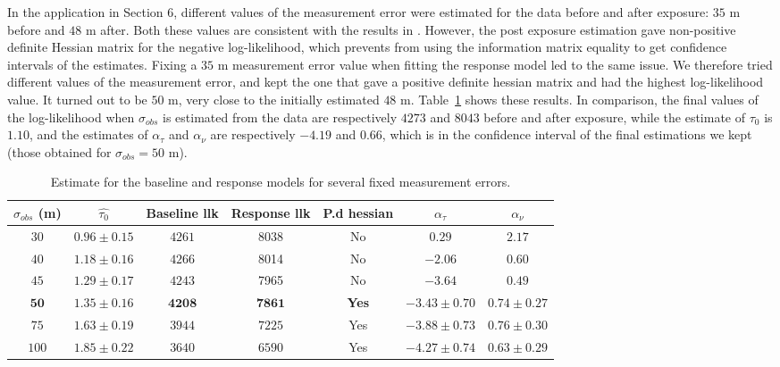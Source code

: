 \documentclass[aoas]{imsart}
\theoremstyle{definition}
\theoremstyle{remark}
\theoremstyle{remark}
\newcommand {\1}{\mathbb{1}}
\begin{document}
In the application in Section 6, different values of the measurement error were estimated for the data before and after exposure: $35$ m before and $48$ m after. Both these values are consistent with the results in \citep{wensveen_path_2015}. However, the post exposure estimation gave non-positive definite Hessian matrix for the negative log-likelihood, which prevents from using the information matrix equality to get confidence intervals of the estimates. Fixing a $35$ m measurement error value when fitting the response model led to the same issue. We therefore tried different values of the measurement error, and kept the one that gave a positive definite hessian matrix and had the highest log-likelihood value. It turned out to be $50$ m, very close to the initially estimated $48$ m. Table~\ref{tab: estimates for fixed measurement errors} shows these results. In comparison, the final values of the log-likelihood when $\sigma_{obs}$ is estimated from the data are respectively $4273$ and $8043$ before and after exposure, while the estimate of $\tau_0$ is $1.10$, and the estimates of $\alpha_\tau$ and $\alpha_\nu$ are respectively $-4.19$ and $0.66$, which is in the confidence interval of the final estimations we kept (those obtained for $\sigma_{obs}=50$ m).
\begin{table}[ht!]
	\centering
	\begin{tabular}{|c|c|c|c|c|c|c|}
		\hline
		$\sigma_{obs}$ (m) & $\hat{\tau_0}$ & Baseline llk & Response llk & P.d hessian & $\alpha_{\tau}$ & $\alpha_\nu$ \\
		\hline
		$30$  & $0.96 \pm 0.15$ & $4261$  & 8038 & No & $0.29$ & $2.17$ \\
		\hline
		$40$  & $1.18 \pm 0.16$   & $4266$ & 8014  & No  & $-2.06$ & $0.60$\\
		\hline
		$45$  & $1.29 \pm 0.17$   & $4243$ & 7965  & No & $-3.64$ & $0.49$\\
		\hline
		$\mathbf{50}$  & $\mathbf{1.35 \pm 0.16}$ & $\mathbf{4208}$ & $\mathbf{7861}$ & \textbf{Yes} & $\mathbf{-3.43 \pm 0.70}$ & $\mathbf{0.74 \pm 0.27}$\\
		\hline
		$75$ &  $1.63 \pm 0.19$ & $3944$ & $7225$ & Yes & $-3.88 \pm 0.73$ & $0.76 \pm 0.30$\\
		\hline 
		$100$ & $1.85 \pm 0.22$ & $3640$ & $6590$ & Yes & $-4.27 \pm 0.74$ & $0.63 \pm 0.29$ \\
		\hline 
	\end{tabular}
	\caption{Estimate for the baseline and response models for several fixed measurement errors.}
	\label{tab: estimates for fixed measurement errors}
\end{table}
\end{document}
